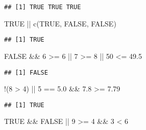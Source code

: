 \documentclass[
]{book}
\newenvironment{Shaded}{\begin{snugshade}}{\end{snugshade}}
\newcommand{\ConstantTok}[1]{\textcolor[rgb]{0.00,0.00,0.00}{#1}}
\newcommand{\DecValTok}[1]{\textcolor[rgb]{0.00,0.00,0.81}{#1}}
\newcommand{\FloatTok}[1]{\textcolor[rgb]{0.00,0.00,0.81}{#1}}
\newcommand{\FunctionTok}[1]{\textcolor[rgb]{0.00,0.00,0.00}{#1}}
\newcommand{\NormalTok}[1]{#1}
\newcommand{\SpecialCharTok}[1]{\textcolor[rgb]{0.00,0.00,0.00}{#1}}
\begin{document}
\begin{verbatim}
## [1] TRUE TRUE TRUE
\end{verbatim}

\begin{Shaded}
\begin{Highlighting}[]
\ConstantTok{TRUE} \SpecialCharTok{||} \FunctionTok{c}\NormalTok{(}\ConstantTok{TRUE}\NormalTok{, }\ConstantTok{FALSE}\NormalTok{, }\ConstantTok{FALSE}\NormalTok{)}
\end{Highlighting}
\end{Shaded}

\begin{verbatim}
## [1] TRUE
\end{verbatim}

\begin{Shaded}
\begin{Highlighting}[]
\ConstantTok{FALSE} \SpecialCharTok{\&\&} \DecValTok{6} \SpecialCharTok{\textgreater{}=} \DecValTok{6} \SpecialCharTok{||} \DecValTok{7} \SpecialCharTok{\textgreater{}=} \DecValTok{8} \SpecialCharTok{||} \DecValTok{50} \SpecialCharTok{\textless{}=} \FloatTok{49.5}
\end{Highlighting}
\end{Shaded}

\begin{verbatim}
## [1] FALSE
\end{verbatim}

\begin{Shaded}
\begin{Highlighting}[]
\SpecialCharTok{!}\NormalTok{(}\DecValTok{8} \SpecialCharTok{\textgreater{}} \DecValTok{4}\NormalTok{) }\SpecialCharTok{||}  \DecValTok{5} \SpecialCharTok{==} \FloatTok{5.0} \SpecialCharTok{\&\&} \FloatTok{7.8} \SpecialCharTok{\textgreater{}=} \FloatTok{7.79}
\end{Highlighting}
\end{Shaded}

\begin{verbatim}
## [1] TRUE
\end{verbatim}

\begin{Shaded}
\begin{Highlighting}[]
\ConstantTok{TRUE} \SpecialCharTok{\&\&} \ConstantTok{FALSE} \SpecialCharTok{||} \DecValTok{9} \SpecialCharTok{\textgreater{}=} \DecValTok{4} \SpecialCharTok{\&\&} \DecValTok{3} \SpecialCharTok{\textless{}} \DecValTok{6}
\end{Highlighting}
\end{Shaded}
\end{document}
